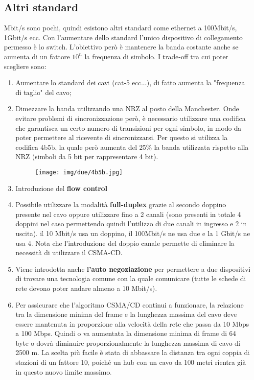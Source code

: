 \documentclass{article}
\begin{document}
\subsection{Altri standard}
 Mbit/s sono pochi, quindi esistono altri standard come ethernet a 100Mbit/s, 1Gbit/s ecc. Con l'aumentare dello standard
l'unico dispositivo di collegamento permesso è lo switch. L'obiettivo però è mantenere la banda costante anche se aumenta di un fattore $10^n$ la 
frequenza di simbolo. I trade-off tra cui poter scegliere sono:
\begin{enumerate}
    \item Aumentare lo standard dei cavi (cat-5 ecc...), di fatto aumenta la "frequenza di taglio" del cavo;
    \item Dimezzare la banda utilizzando una NRZ al posto della Manchester. Onde evitare problemi di sincronizzazione però, è necessario 
    utilizzare una codifica che garantisca un certo numero di transizioni per ogni simbolo, in modo da poter permettere al ricevente di 
    sincronizzarsi. Per questo si utilizza la codifica 4b5b, la quale però aumenta del 25\% la banda utilizzata rispetto alla NRZ (simboli da 5 bit per rappresentare
    4 bit).
    \begin{figure}[!ht]
        \begin{center}
            \texttt{[image: img/due/4b5b.jpg]}         
        \end{center}
    \end{figure}

    \item Introduzione del \textbf{flow control}
    \item Possibile utilizzare la modalità \textbf{full-duplex} grazie al secondo doppino presente nel cavo oppure utilizzare fino 
    a 2 canali (sono presenti in totale 4 doppini nel caso permettendo quindi l'utilizzo di due canali in ingresso e 2 in uscita).
    il 10 Mbit/s usa un doppino, il 100Mbit/s ne usa due e la 1 Gbit/s ne usa 4. Nota che l'introduzione del doppio canale permette di eliminare
    la necessità di utilizzare il CSMA-CD.
    \item Viene introdotta anche \textbf{l'auto negoziazione} per permettere a due dispositivi di trovare una tecnologia comune con la quale
    comunicare (tutte le schede di rete devono poter andare almeno a 10 Mbit/s).
    \item   Per   assicurare che l'algoritmo CSMA/CD continui a funzionare, la relazione tra la dimensione
    minima del frame e la lunghezza massima del cavo deve essere mantenuta in proporzione
    alla velocità della rete che passa da 10 Mbps a 100 Mbps. Quindi o va aumentata la dimensione minima di frame di 64 byte o dovrà diminuire proporzionalmente la lunghezza
     massima di cavo di 2500 m. La scelta più facile è stata di abbassare la distanza tra ogni coppia di
    stazioni di un fattore 10, poiché un hub con un cavo da 100 metri rientra già in questo nuovo
    limite massimo.
 \end{enumerate}
\end{document}
